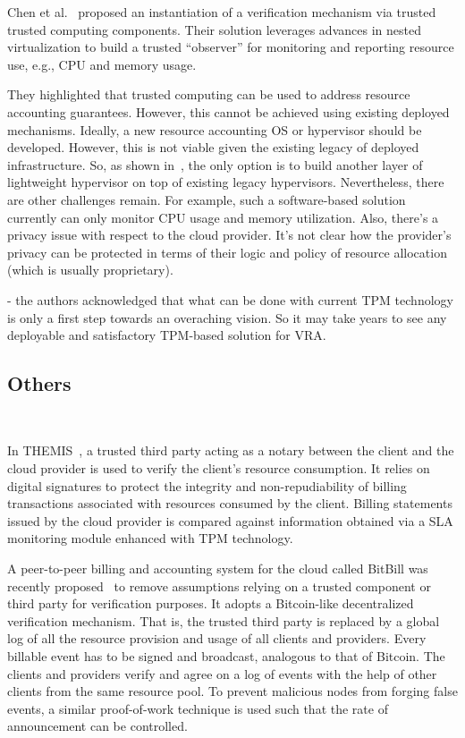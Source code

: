 Chen et al.~\cite{CMP+13} proposed an instantiation of a verification mechanism via trusted trusted computing components. 
Their solution leverages advances in nested virtualization to build a trusted ``observer'' for monitoring and reporting resource use, e.g., CPU and memory usage.

They highlighted that trusted computing can be used to address resource accounting guarantees. However, this cannot be achieved using existing deployed mechanisms. Ideally, a new resource accounting OS or hypervisor should be developed. However, this is not viable given the existing legacy of deployed infrastructure. So, as shown in~\cite{CMP+13}, the only option is to build another layer of lightweight hypervisor on top of existing legacy hypervisors. Nevertheless, there are other challenges remain. For example, such a software-based solution currently can only monitor CPU usage and memory utilization. Also, there's a privacy issue with respect to the cloud provider. It's not clear how the provider's privacy can be protected in terms of their logic and policy of resource allocation (which is usually proprietary).

- the authors acknowledged that what can be done with current TPM technology is only a first step towards an overaching vision. So it may take years to see any deployable and satisfactory TPM-based solution for VRA.

\subsection{Others} \label{sect:other-trends}


~\cite{YZS+12}

In THEMIS~\cite{PHC+13}, a trusted third party acting as a notary between the client and the cloud provider is used to verify the client’s resource consumption. It relies on digital signatures to protect the integrity and non-repudiability of billing transactions associated with resources consumed by the client. Billing statements issued by the cloud provider is compared against information obtained via a SLA monitoring module enhanced with TPM technology.

A peer-to-peer billing and accounting system for the cloud called BitBill was recently proposed~\cite{CC14} to remove assumptions relying on a trusted component or third party for verification purposes. It adopts a Bitcoin-like decentralized verification mechanism. That is, the trusted third party is replaced by a global log of all the resource provision and usage of all clients and providers. Every billable event has to be signed and broadcast, analogous to that of Bitcoin. The clients and providers verify and agree on a log of events with the help of other clients from the same resource pool. To prevent malicious nodes from forging false events, a similar proof-of-work technique is used such that the rate of announcement can be controlled.

